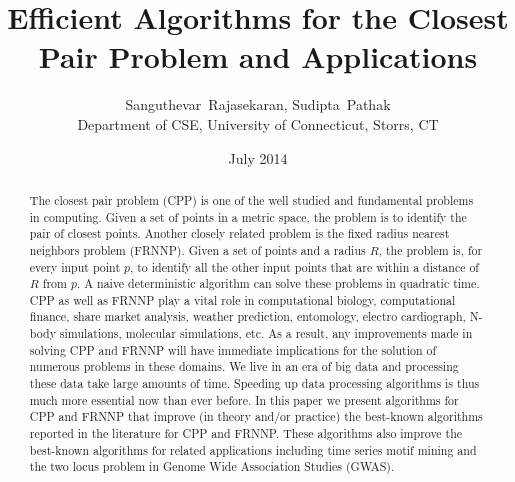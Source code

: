 \documentclass{article}
\title{Efficient Algorithms for the Closest Pair Problem and Applications}
\author{Sanguthevar~Rajasekaran,
        Sudipta~Pathak\\
Department of CSE, University of Connecticut, Storrs, CT}
\date{July 2014}
\theoremstyle{definition}
\theoremstyle{remark}
\begin{document}
\maketitle
\begin{abstract}
The closest pair problem (CPP)  is one of the well studied and fundamental problems in computing. Given a set of points in a metric space, the problem is to identify the pair of closest points. Another closely related problem is the fixed radius nearest neighbors problem (FRNNP). Given a set of points and a radius $R$, the problem is, for every input point $p$, to identify all the other input points that are within a distance of $R$ from $p$. A naive deterministic algorithm can solve these problems in quadratic time. CPP as well as FRNNP play a vital role in computational biology, computational finance, share market analysis, weather prediction, entomology, electro cardiograph, N-body simulations, molecular simulations, etc. As a result, any improvements made in solving CPP and FRNNP will have immediate implications for the solution of numerous problems in these domains. We live in an era of big data and processing these data take large amounts of time. Speeding up data processing algorithms is thus much more essential now than ever before. In this paper we present algorithms for CPP and FRNNP that improve (in theory and/or practice) the best-known algorithms reported in the literature for CPP and FRNNP. These algorithms also improve the best-known algorithms for related applications including time series motif mining and the two locus problem in Genome Wide Association Studies (GWAS).
\end{abstract}
\end{document}
